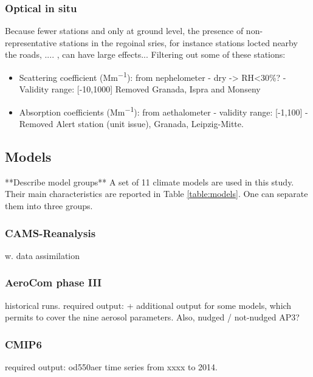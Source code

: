 \documentclass[journal abbreviation, manuscript]{copernicus}
\begin{document}
\subsubsection{Optical in situ}
Because fewer stations and only at ground level, the presence of non-representative stations in the regoinal sries, for instance stations locted nearby the roads, .... , can have large effects... Filtering out some of these stations: 

\begin{itemize}
 \item Scattering coefficient (\unit{Mm^{-1}}): from nephelometer - dry -> RH<30\%? - Validity range: [-10,1000]
 Removed Granada, Ispra and Monseny
 \item Absorption coefficients (\unit{Mm^{-1}}): from aethalometer - validity range: [-1,100] - Removed Alert station (unit issue), Granada, Leipzig-Mitte.
\end{itemize}

\subsection{Models}
**Describe model groups**
A set of 11 climate models are used in this study. Their main characteristics are reported in Table \ref{table:models}.  One can separate them into three groups.

\subsubsection{CAMS-Reanalysis}
w. data assimilation

\subsubsection{AeroCom phase III}
historical runs.
required output: + additional output for some models, which permits to cover the nine aerosol parameters.
Also, nudged / not-nudged AP3?

\subsubsection{CMIP6}
required output: od550aer time series from xxxx to 2014.
\end{document}
